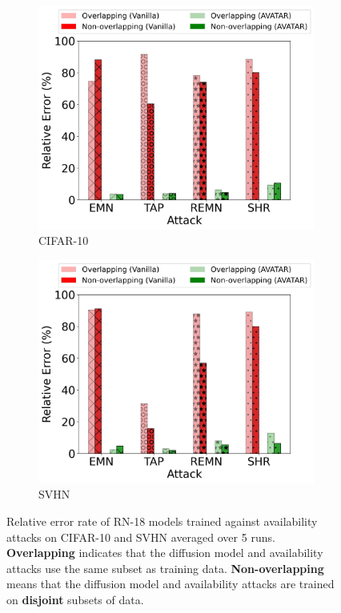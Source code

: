 \documentclass[conference]{IEEEtran}
\theoremstyle{definition}
\theoremstyle{remark}
\theoremstyle{proposition}
\begin{document}
\begin{figure}[t!]
	\centering
	\begin{subfigure}{.40\textwidth}
		\centering
		\includegraphics[width=1.0\textwidth]{./figures/RN-18_Overlap_CIFAR-10}
		\caption{CIFAR-10}
		\label{fig:nonoverlap:cifar10}
	\end{subfigure}\hspace*{5em}
	\begin{subfigure}{.40\textwidth}
		\centering
		\includegraphics[width=1.0\textwidth]{./figures/RN-18_Overlap_SVHN}
		\caption{SVHN}
		\label{fig:nonoverlap:svhn}
	\end{subfigure}
    \caption{Relative error rate of RN-18 models trained against availability attacks on CIFAR-10 and SVHN averaged over 5 runs. \textbf{Overlapping} indicates that the diffusion model and availability attacks use the same subset as training data. \textbf{Non-overlapping} means that the diffusion model and availability attacks are trained on \textbf{disjoint} subsets of data.}
	\label{fig:nonoverlap}
\end{figure}
\end{document}
